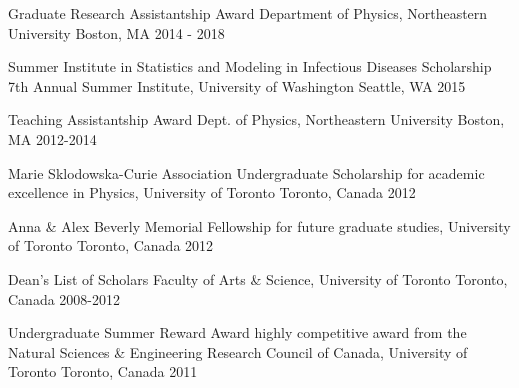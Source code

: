 



\begin{cvhonors}
  \cvhonor
    {Graduate Research Assistantship Award} %
    {Department of Physics, Northeastern University} %
    {Boston, MA} %
    {2014 - 2018} %

  \cvhonor
    {Summer Institute in Statistics and Modeling in Infectious Diseases Scholarship} %
    {7th Annual Summer Institute, University of Washington} %
    {Seattle, WA} %
    {2015} %

  \cvhonor
    {Teaching Assistantship Award} %
    {Dept. of Physics, Northeastern University} %
    {Boston, MA} %
    {2012-2014} %

  \cvhonor
    {Marie Sklodowska-Curie Association Undergraduate Scholarship} %
    {for academic excellence in Physics, University of Toronto} %
    {Toronto, Canada} %
    {2012} %

  \cvhonor
    {Anna \& Alex Beverly Memorial Fellowship} %
    {for future graduate studies, University of Toronto} %
    {Toronto, Canada} %
    {2012} %

  \cvhonor
    {Dean's List of Scholars} %
    {Faculty of Arts \& Science, University of Toronto} %
    {Toronto, Canada} %
    {2008-2012} %
    
  \cvhonor
    {Undergraduate Summer Reward Award} %
    {highly competitive award from the Natural Sciences \& Engineering Research Council of Canada, University of Toronto} %
    {Toronto, Canada} %
    {2011} %


\end{cvhonors}
